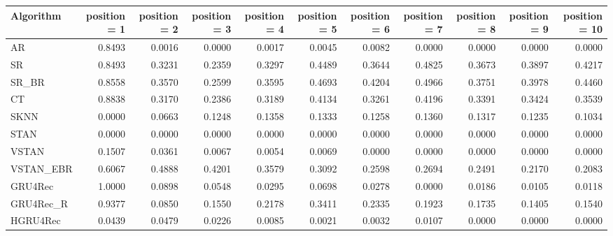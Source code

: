 \begin{tabular}{lrrrrrrrrrr}
\toprule
 Algorithm &  position = 1 &  position = 2 &  position = 3 &  position = 4 &  position = 5 &  position = 6 &  position = 7 &  position = 8 &  position = 9 &  position = 10 \\
\midrule
        AR &        0.8493 &        0.0016 &        0.0000 &        0.0017 &        0.0045 &        0.0082 &        0.0000 &        0.0000 &        0.0000 &         0.0000 \\
        SR &        0.8493 &        0.3231 &        0.2359 &        0.3297 &        0.4489 &        0.3644 &        0.4825 &        0.3673 &        0.3897 &         0.4217 \\
     SR\_BR &        0.8558 &        0.3570 &        0.2599 &        0.3595 &        0.4693 &        0.4204 &        0.4966 &        0.3751 &        0.3978 &         0.4460 \\
        CT &        0.8838 &        0.3170 &        0.2386 &        0.3189 &        0.4134 &        0.3261 &        0.4196 &        0.3391 &        0.3424 &         0.3539 \\
      SKNN &        0.0000 &        0.0663 &        0.1248 &        0.1358 &        0.1333 &        0.1258 &        0.1360 &        0.1317 &        0.1235 &         0.1034 \\
      STAN &        0.0000 &        0.0000 &        0.0000 &        0.0000 &        0.0000 &        0.0000 &        0.0000 &        0.0000 &        0.0000 &         0.0000 \\
     VSTAN &        0.1507 &        0.0361 &        0.0067 &        0.0054 &        0.0069 &        0.0000 &        0.0000 &        0.0000 &        0.0000 &         0.0000 \\
 VSTAN\_EBR &        0.6067 &        0.4888 &        0.4201 &        0.3579 &        0.3092 &        0.2598 &        0.2694 &        0.2491 &        0.2170 &         0.2083 \\
   GRU4Rec &        1.0000 &        0.0898 &        0.0548 &        0.0295 &        0.0698 &        0.0278 &        0.0000 &        0.0186 &        0.0105 &         0.0118 \\
 GRU4Rec\_R &        0.9377 &        0.0850 &        0.1550 &        0.2178 &        0.3411 &        0.2335 &        0.1923 &        0.1735 &        0.1405 &         0.1540 \\
  HGRU4Rec &        0.0439 &        0.0479 &        0.0226 &        0.0085 &        0.0021 &        0.0032 &        0.0107 &        0.0000 &        0.0000 &         0.0000 \\
\bottomrule
\end{tabular}
